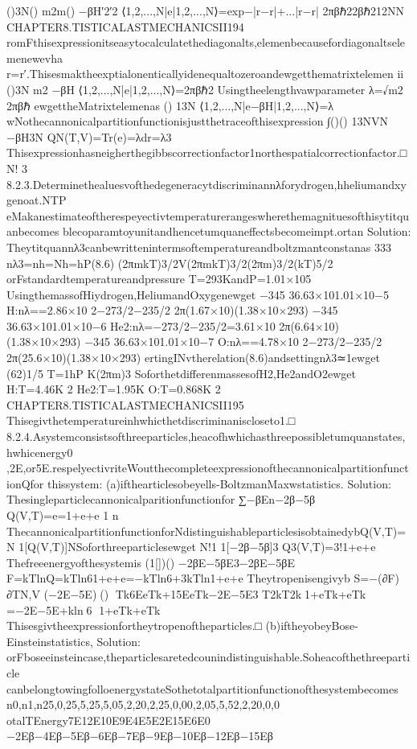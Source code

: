 {{{{{{{{{{()3N()
m2m()
−βH′2′2
⟨1,2,...,N|e|1,2,...,N⟩=exp−|r−r|+...|r−r|
2πβℏ22βℏ212NN
CHAPTER8.TISTICALASTMECHANICSII194
romFthisexpressionitseasytocalculatethediagonalts,elemenbecausefordiagonaltselemenewevha
r=r′.Thisesmaktheexptialonenticallyidenequaltozeroandewgetthematrixtelemen
ii
()3N
m2
−βH
⟨1,2,...,N|e|1,2,...,N⟩=2πβℏ2
Usingtheelengthvawparameter
λ=√m2
2πβℏ
ewgettheMatrixtelemenas
()
13N
⟨1,2,...,N|e−βH|1,2,...,N⟩=λ
wNothecannonicalpartitionfunctionisjustthetraceofthisexpression
∫()()
13NVN
−βH3N
QN(T,V)=Tr(e)=λdr=λ3
Thisexpressionhasneigherthegibbscorrectionfactor1northespatialcorrectionfactor.□
N!
3
8.2.3.Determinethealuesvofthedegeneracytdiscriminannλforydrogen,hheliumandxygenoat.NTP
eMakanestimateoftherespeyectivtemperaturerangeswherethemagnituesofthisytitquanbecomes
blecoparamtoyunitandhencetumquaneffectsbecomeimpt.ortan
Solution:
Theytitquannλ3canbewrittenintermsoftemperatureandboltzmantconstanas
333
nλ3=nh=Nh=hP(8.6)
(2πmkT)3/2V(2πmkT)3/2(2πm)3/2(kT)5/2
orFstandardtemperatureandpressure
T=293KandP=1.01×105
UsingthemassofHiydrogen,HeliumandOxygenewget
−345
36.63×101.01×10−5
H:nλ==2.86×10
2−273/2−235/2
2π(1.67×10)(1.38×10×293)
−345
36.63×101.01×10−6
He2:nλ=−273/2−235/2=3.61×10
2π(6.64×10)(1.38×10×293)
−345
36.63×101.01×10−7
O:nλ==4.78×10
2−273/2−235/2
2π(25.6×10)(1.38×10×293)
ertingINvtherelation(8.6)andsettingnλ3≃1ewget
(62)1/5
T=1hP
K(2πm)3
SoforthetdifferenmassesofH2,He2andO2ewget
H:T=4.46K
2
He2:T=1.95K
O:T=0.868K
2
CHAPTER8.TISTICALASTMECHANICSII195
Thisegivthetemperatureinhwhicthetdiscriminaniscloseto1.□
8.2.4.Asystemconsistsofthreeparticles,heacofhwhichasthreepossibletumquanstates,hwhicenergy0
,2E,or5E.respelyectivriteWoutthecompleteexpressionofthecannonicalpartitionfunctionQfor
thissystem:
(a)ifthearticlesobeyells-BoltzmanMaxwstatistics.
Solution:
Thesingleparticlecannonicalparitionfunctionfor
∑−βEn−2β−5β
Q(V,T)=e=1+e+e
1
n
ThecannonicalpartitionfunctionforNdistinguishableparticlesisobtainedybQ(V,T)=
N
1[Q(V,T)]NSoforthreeparticlesewget
N!1
1[−2β−5β]3
Q3(V,T)=3!1+e+e
Thefreeenergyofthesystemis
(1[])()
−2βE−5βE3−2βE−5βE
F=kTlnQ=kTln61+e+e=−kTln6+3kTln1+e+e
Theytropenisengivyb
S=−(∂F)
∂TN,V
(−2E−5E)()
Tk6EeTk+15EeTk−2E−5E3
T2kT2k1+eTk+eTk
=−2E−5E+kln6
1+eTk+eTk
Thisesgivtheexpressionfortheytropenoftheparticles.□
(b)iftheyobeyBose-Einsteinstatistics,
Solution:
orFboseeinsteincase,theparticlesaretedcounindistinguishable.Soheacofthethreeparticle
canbelongtowingfolloenergystateSothetotalpartitionfunctionofthesystembecomes
n0,n1,n25,0,25,5,25,5,05,2,20,2,25,0,00,2,05,5,52,2,20,0,0
otalTEnergy7E12E10E9E4E5E2E15E6E0
−2Eβ−4Eβ−5Eβ−6Eβ−7Eβ−9Eβ−10Eβ−12Eβ−15Eβ
}}}}}}}}}}
